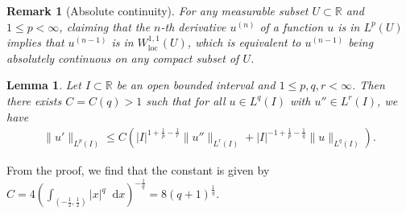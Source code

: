 \documentclass{article}
\newcommand{\dd}{\mathop{}\mathrm{d}} %
\numberwithin{figure}{section}
\newcommand{\R}{\mathbb{R}}
\newtheorem{lemma}[theorem]{Lemma}
\newtheorem{rem}[theorem]{Remark}
\numberwithin{equation}{section}
\begin{document}
\begin{rem}[Absolute continuity] \label{abscont}
    For any measurable subset $U \subset \R$ and $1 \leq p < \infty$, claiming that the $n$-th derivative $u^{(n)}$ of a function $u$ is in $L^p(U)$ implies that $u^{(n-1)}$ is in $W^{1,1}_{\mathrm{loc}}(U)$, which is equivalent to $u^{(n-1)}$ being absolutely continuous on any compact subset of $U$.
\end{rem}

\begin{lemma} \label{IntLem}
Let $I \subset \R$ be an open bounded interval and $1 \leq p,q,r < \infty$. Then there exists $C=C(q)>1$ such that for all $u \in L^q(I)$ with $u'' \in L^{r}(I)$, we have
\begin{align} \label{eq:IntLem}
    \|u'\|_{L^p(I)} \leq C\left( |I|^{1+\frac 1p - \frac 1r}\|u''\|_{L^r(I)} + |I|^{-1+\frac 1p - \frac 1q}\|u\|_{L^q(I)}\right).
\end{align}
\end{lemma}

From the proof, we find that the constant is given by $C=4 \left( \int_{(-\frac 12,\frac 12)} |x|^q\dd x \right)^{-\frac1q}=8(q+1)^{\frac 1q}$.
\end{document}
